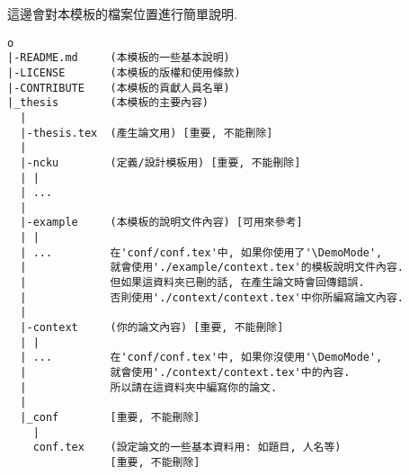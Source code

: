 
這邊會對本模板的檔案位置進行簡單說明.

\EmptyLine
\begin{fmpage}{\textwidth}
\begin{verbatim}
o
|-README.md     (本模板的一些基本說明)
|-LICENSE       (本模板的版權和使用條款)
|-CONTRIBUTE    (本模板的貢獻人員名單)
|_thesis        (本模板的主要內容)
  |
  |-thesis.tex  (產生論文用) [重要, 不能刪除]
  | 
  |-ncku        (定義/設計模板用) [重要, 不能刪除]
  | |
  | ...
  |
  |-example     (本模板的說明文件內容) [可用來參考]
  | |
  | ...         在'conf/conf.tex'中, 如果你使用了'\DemoMode',
  |             就會使用'./example/context.tex'的模板說明文件內容.
  |             但如果這資料夾已刪的話, 在產生論文時會回傳錯誤.
  |             否則使用'./context/context.tex'中你所編寫論文內容.
  |
  |-context     (你的論文內容) [重要, 不能刪除]
  | |
  | ...         在'conf/conf.tex'中, 如果你沒使用'\DemoMode',
  |             就會使用'./context/context.tex'中的內容.
  |             所以請在這資料夾中編寫你的論文.
  |
  |_conf        [重要, 不能刪除]
    |
    conf.tex    (設定論文的一些基本資料用: 如題目, 人名等)
                [重要, 不能刪除]
\end{verbatim}
\end{fmpage}

